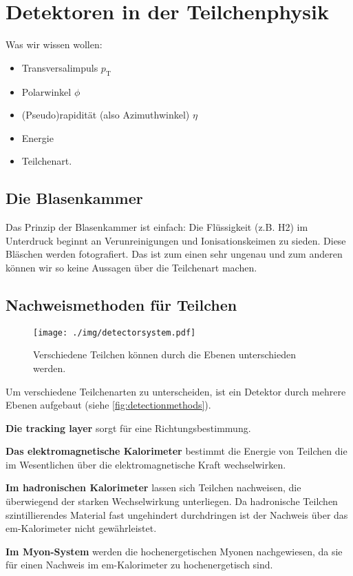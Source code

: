 \chapter{Detektoren in der Teilchenphysik}
Was wir wissen wollen:
\begin{itemize}
	\item Transversalimpuls $p_\text{T}$
	\item Polarwinkel $\phi$
	\item (Pseudo)rapidität (also Azimuthwinkel) $\eta$
	\item Energie
	\item Teilchenart.
\end{itemize}

\section{Die Blasenkammer}
Das Prinzip der Blasenkammer ist einfach:
Die Flüssigkeit (z.B. H2) im Unterdruck beginnt an Verunreinigungen und Ionisationskeimen zu sieden.
Diese Bläschen werden fotografiert.
Das ist zum einen sehr ungenau und zum anderen können wir so keine Aussagen über die Teilchenart machen.

\section{Nachweismethoden für Teilchen}
\begin{figure}
	\centering
	\texttt{[image: ./img/detectorsystem.pdf]}
	\caption{Verschiedene Teilchen können durch die Ebenen unterschieden werden.}
	\label{fig:detectionmethods}
\end{figure}
Um verschiedene Teilchenarten zu unterscheiden, ist ein Detektor durch mehrere Ebenen aufgebaut (siehe \autoref{fig:detectionmethods}).

\textbf{Die tracking layer} sorgt für eine Richtungsbestimmung.

\textbf{Das elektromagnetische Kalorimeter} bestimmt die Energie von Teilchen die im Wesentlichen über die elektromagnetische Kraft wechselwirken.

\textbf{Im hadronischen Kalorimeter} lassen sich Teilchen nachweisen, die überwiegend der starken Wechselwirkung unterliegen.
Da hadronische Teilchen szintillierendes Material fast ungehindert durchdringen ist der Nachweis über das em-Kalorimeter nicht gewährleistet.

\textbf{Im Myon-System} werden die hochenergetischen Myonen nachgewiesen, da sie für einen Nachweis im em-Kalorimeter zu hochenergetisch sind.

